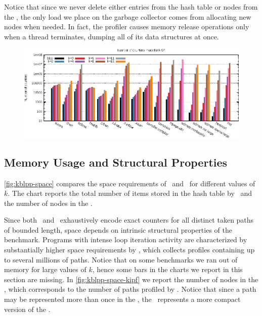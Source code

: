 \noindent Notice that since we never delete either entries from the hash table or nodes from the \ksf, the only load we place on the garbage collector comes from allocating new nodes when needed. In fact, the profiler causes memory release operations only when a thread terminates, dumping all of its data structures at once.

\ifdefined\noauthorea
\begin{figure}[!ht]
\begin{center}
\includegraphics[width=\textwidth]{figures/kblpp-space/kblpp-space.eps}
\caption{\protect}
\end{center}
\end{figure}
\fi

\subsection{Memory Usage and Structural Properties}
\myfigure\ref{fig:kblpp-space} compares the space requirements of \blpp\ and \kblpp\ for different values of $k$. The chart reports the total number of items stored in the hash table by \blpp\ and the number of nodes in the \ksf.

Since both \blpp\ and \kblpp\ exhaustively encode exact counters for all distinct taken paths of bounded length, space depends on intrinsic structural properties of the benchmark. Programs with intense loop iteration activity are characterized by substantially higher space requirements by \kblpp, which collects profiles containing up to several millions of paths. Notice that on some benchmarks we ran out of memory for large values of $k$, hence some bars in the charts we report in this section are missing. In \myfigure\ref{fig:kblpp-space-kipf} we report the number of nodes in the \kipf, which corresponds to the number of paths profiled by \kblpp. Notice that since a path may be represented more than once in the \ksf, the \kipf\ represents a more compact version of the \ksf.

